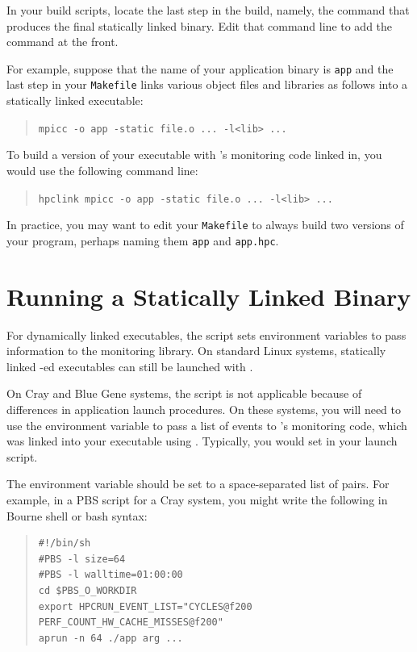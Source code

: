 \documentclass[11pt,letterpaper]{report}
\begin{document}
In your build scripts, locate the last step in the build, namely, the command that produces the final statically linked binary.
Edit that command line to add the \hpclink{} command at the front.

For example, suppose that the name of your application binary is \texttt{app} and the last step in
your \texttt{Makefile} links various object files and libraries as
follows into a statically linked executable:
\begin{quote}
  \verb|mpicc -o app -static file.o ... -l<lib> ...|
\end{quote}
To build a version of your executable with \HPCToolkit's monitoring code linked in, you would use the following command line:
\begin{quote}
  \verb|hpclink mpicc -o app -static file.o ... -l<lib> ...|
\end{quote}

In practice, you may want to edit your \texttt{Makefile} to always build two versions of your program, perhaps naming them \texttt{app} and \texttt{app.hpc}.


\section{Running a Statically Linked Binary}

For dynamically linked executables, the \hpcrun{} script sets environment variables to pass information to the \HPCToolkit{} monitoring library.
On standard Linux systems, statically linked \hpclink{}-ed executables can still be launched with \hpcrun{}.

On Cray and Blue Gene systems, the \hpcrun{} script is not applicable because of differences in application launch procedures.
On these systems, you will need to use the  environment variable to pass a list of events to \HPCToolkit{}'s monitoring code, which was linked into your executable using \hpclink{}.
Typically, you would set  in your launch script.

The  environment variable should be set to a space-separated list of  pairs.
For example, in a PBS script for a Cray system, you might write the following in Bourne shell or bash syntax:
\begin{quote}
\begin{verbatim}
#!/bin/sh
#PBS -l size=64
#PBS -l walltime=01:00:00
cd $PBS_O_WORKDIR
export HPCRUN_EVENT_LIST="CYCLES@f200 PERF_COUNT_HW_CACHE_MISSES@f200"
aprun -n 64 ./app arg ...
\end{verbatim}
\end{quote}
\end{document}
